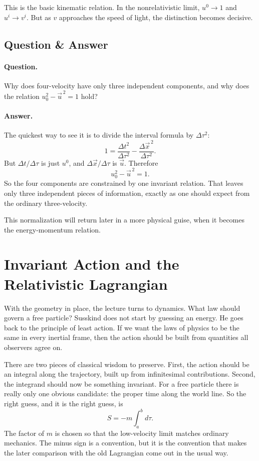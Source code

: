 This is the basic kinematic relation. In the nonrelativistic limit, \(u^0\to 1\) and \(u^i\to v^i\). But as \(v\) approaches the speed of light, the distinction becomes decisive.

\subsection{Question \& Answer}

\paragraph{Question.}
Why does four-velocity have only three independent components, and why does the relation \(u_0^2-\vec u^{\,2}=1\) hold?

\paragraph{Answer.}
The quickest way to see it is to divide the interval formula by \(\Delta \tau^2\):
\begin{equation}
1
=
\frac{\Delta t^2}{\Delta\tau^2}
-
\frac{\Delta \vec x^{\,2}}{\Delta\tau^2}.
\end{equation}
But \(\Delta t/\Delta\tau\) is just \(u^0\), and \(\Delta \vec x/\Delta\tau\) is \(\vec u\). Therefore
\begin{equation}
u_0^2-\vec u^{\,2}=1.
\end{equation}
So the four components are constrained by one invariant relation. That leaves only three independent pieces of information, exactly as one should expect from the ordinary three-velocity.

This normalization will return later in a more physical guise, when it becomes the energy-momentum relation.

\section{Invariant Action and the Relativistic Lagrangian}

With the geometry in place, the lecture turns to dynamics. What law should govern a free particle? Susskind does not start by guessing an energy. He goes back to the principle of least action. If we want the laws of physics to be the same in every inertial frame, then the action should be built from quantities all observers agree on.

There are two pieces of classical wisdom to preserve. First, the action should be an integral along the trajectory, built up from infinitesimal contributions. Second, the integrand should now be something invariant. For a free particle there is really only one obvious candidate: the proper time along the world line. So the right guess, and it is the right guess, is
\begin{equation}
S=-m\int_a^b d\tau.
\end{equation}
The factor of \(m\) is chosen so that the low-velocity limit matches ordinary mechanics. The minus sign is a convention, but it is the convention that makes the later comparison with the old Lagrangian come out in the usual way.

